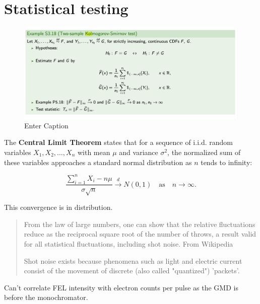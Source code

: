 \section{Statistical testing}

\begin{figure}[t]
    \centering
    \includegraphics[width=1\linewidth]{images/2024-08-27-15.11.15.png}
    \caption{Enter Caption}
\end{figure}



The \textbf{Central Limit Theorem} states that for a sequence of i.i.d. random variables \(X_1, X_2, \ldots, X_n\) with mean \( \mu \) and variance \( \sigma^2 \), the normalized sum of these variables approaches a standard normal distribution as \(n\) tends to infinity:

\[
\frac{\sum_{i=1}^{n} X_i - n\mu}{\sigma \sqrt{n}} \xrightarrow{d} N(0, 1) \quad \text{as} \quad n \to \infty.
\]

This convergence is in distribution.
\begin{quotation}
    From the law of large numbers, one can show that the relative fluctuations reduce as the reciprocal square root of the number of throws, a result valid for all statistical fluctuations, including shot noise. From Wikipedia
    
    Shot noise exists because phenomena such as light and electric current consist of the movement of discrete (also called "quantized") 'packets'.
\end{quotation}

Can't correlate FEL intensity with electron counts per pulse as the GMD is before the monochromator. 

